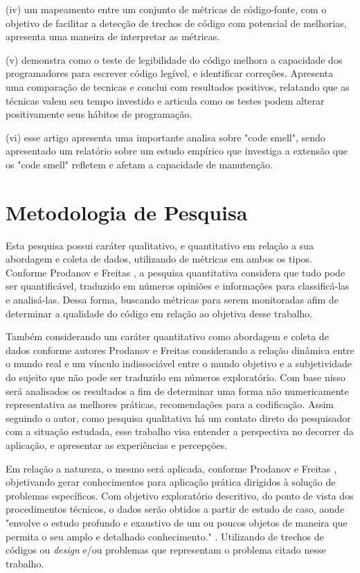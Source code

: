 \documentclass[12pt]{article}
\begin{document}
 (iv) \cite{TR_CLEAN_CODE_METRICA} um mapeamento entre um conjunto de métricas de código-fonte, com o objetivo de facilitar a detecção de trechos de código com potencial de melhorias, apresenta uma maneira de interpretar as métricas.

 (v) \cite{CODE_READABILITY_TESTING_STUDY} demonstra
como o teste de legibilidade do código melhora a capacidade dos programadores
para escrever código legível, e identificar correções. Apresenta uma comparação de tecnicas e conclui com resultados positivos, relatando que as técnicas valem seu tempo investido e articula como os testes podem alterar positivamente seus hábitos de programação.
 
 (vi) \cite{CODE_SMELLS_REFLECT_IMPORTANT_MAINTAINABILITY_ASPECTS} esse artigo apresenta uma importante analisa sobre "code smell", sendo apresentado um relatório sobre um estudo empírico que investiga a extensão que os "code smell" refletem e afetam a capacidade de manutenção.

\part{Metodologia de Pesquisa} \label{sec:metodologia_Pesquisa}

Esta pesquisa possui caráter qualitativo, e quantitativo em relação a sua abordagem e coleta de dados, utilizando de métricas em ambos os tipos. Conforme Prodanov e Freitas \cite{METOLOGIA}, a pesquisa quantitativa  considera que tudo pode ser quantificável, traduzido em números opiniões e informações para classificá-las e analisá-las. Dessa forma, buscando métricas para serem monitoradas afim de determinar a qualidade do código em relação ao objetiva desse trabalho.

Também considerando um caráter quantitativo como abordagem e coleta de dados conforme autores Prodanov e Freitas \cite{METOLOGIA} considerando a relação dinâmica entre o mundo real e um  vínculo  indissociável  entre  o  mundo  objetivo e  a  subjetividade  do  sujeito  que  não  pode  ser  traduzido  em  números
exploratório. Com base nisso será analisados os resultados a fim de determinar uma forma não numericamente representativa as melhores práticas, recomendações para a codificação. Assim seguindo o autor, como pesquisa qualitativa há um contato direto do pesquisador com a situação estudada, esse trabalho visa entender a perspectiva no decorrer da aplicação, e apresentar as experiências e percepções.

Em relação a natureza, o mesmo será aplicada, conforme Prodanov e Freitas \cite{METOLOGIA}, objetivando gerar conhecimentos para aplicação prática dirigidos à solução de problemas específicos. Com objetivo exploratório descritivo, do ponto de vista dos procedimentos técnicos, o dados serão obtidos a partir de estudo de caso, aonde "envolve  o  estudo  profundo  e  exaustivo  de  um  ou  poucos  objetos  de  maneira  que  permita  o  seu  amplo  e  detalhado  conhecimento." \cite{METOLOGIA}. Utilizando de trechos de códigos ou \textit{design} e/ou problemas que representam o problema citado nesse trabalho.
\end{document}
